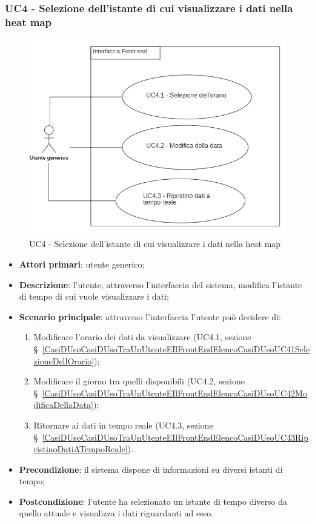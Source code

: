 \subsubsection{UC4 - Selezione dell’istante di cui visualizzare i dati nella heat map
}\label{CasiDUsoCasiDUsoTraUnUtenteEIlFrontEndElencoCasiDUsoUC4SelezioneDellIstanzeDiCuiVisualizzareIDatiNellaHeatmap}%
\begin{center}
	\begin{figure}[H]
		\includegraphics{../immagini/attori_casi/uc4.png}
		\caption{UC4 - Selezione dell’istante di cui visualizzare i dati nella heat map}
	\end{figure}
\end{center}
\begin{itemize}
	\item \textbf{Attori primari}: utente generico;
	\item \textbf{Descrizione}: l’utente, attraverso l’interfaccia del sistema, modifica l’istante di tempo di cui vuole visualizzare i dati;
	\item \textbf{Scenario principale}: attraverso l’interfaccia l’utente può decidere di:
		\begin{enumerate}
			\item Modificare l’orario dei dati da visualizzare (UC4.1, sezione  \S~\ref{CasiDUsoCasiDUsoTraUnUtenteEIlFrontEndElencoCasiDUsoUC41SelezioneDellOrario});
			\item Modificare il giorno tra quelli disponibili (UC4.2, sezione \S~\ref{CasiDUsoCasiDUsoTraUnUtenteEIlFrontEndElencoCasiDUsoUC42ModificaDellaData});
			\item Ritornare ai dati in tempo reale (UC4.3, sezione \S~\ref{CasiDUsoCasiDUsoTraUnUtenteEIlFrontEndElencoCasiDUsoUC43RipristinoDatiATempoReale}).
		\end{enumerate}
	\item \textbf{Precondizione}: il sistema dispone di informazioni su diversi istanti di tempo;
	\item \textbf{Postcondizione}: l’utente ha selezionato un istante di tempo diverso da quello attuale e visualizza i dati riguardanti ad esso.%
\end{itemize}

